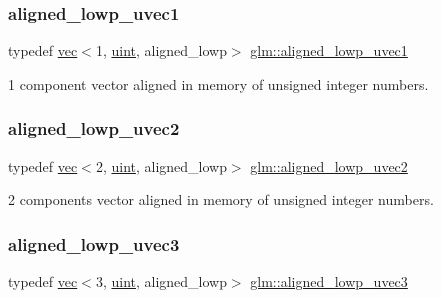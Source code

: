 \subsubsection{\texorpdfstring{aligned\+\_\+lowp\+\_\+uvec1}{aligned\_lowp\_uvec1}}
{\footnotesize\ttfamily typedef \mbox{\hyperlink{structglm_1_1vec}{vec}}$<$1, \mbox{\hyperlink{group__core__precision_ga4fd29415871152bfb5abd588334147c8}{uint}}, aligned\+\_\+lowp$>$ \mbox{\hyperlink{group__gtc__type__aligned_ga00df1f632a2e6c173796b5cede1be57c}{glm\+::aligned\+\_\+lowp\+\_\+uvec1}}}



1 component vector aligned in memory of unsigned integer numbers. 

\mbox{\label{group__gtc__type__aligned_gabd374d47967c0eefc8b98a405d064cc6}} 
\subsubsection{\texorpdfstring{aligned\+\_\+lowp\+\_\+uvec2}{aligned\_lowp\_uvec2}}
{\footnotesize\ttfamily typedef \mbox{\hyperlink{structglm_1_1vec}{vec}}$<$2, \mbox{\hyperlink{group__core__precision_ga4fd29415871152bfb5abd588334147c8}{uint}}, aligned\+\_\+lowp$>$ \mbox{\hyperlink{group__gtc__type__aligned_gabd374d47967c0eefc8b98a405d064cc6}{glm\+::aligned\+\_\+lowp\+\_\+uvec2}}}



2 components vector aligned in memory of unsigned integer numbers. 

\mbox{\label{group__gtc__type__aligned_gadaa291d4c8716193c6294d6e711eb071}} 
\subsubsection{\texorpdfstring{aligned\+\_\+lowp\+\_\+uvec3}{aligned\_lowp\_uvec3}}
{\footnotesize\ttfamily typedef \mbox{\hyperlink{structglm_1_1vec}{vec}}$<$3, \mbox{\hyperlink{group__core__precision_ga4fd29415871152bfb5abd588334147c8}{uint}}, aligned\+\_\+lowp$>$ \mbox{\hyperlink{group__gtc__type__aligned_gadaa291d4c8716193c6294d6e711eb071}{glm\+::aligned\+\_\+lowp\+\_\+uvec3}}}



